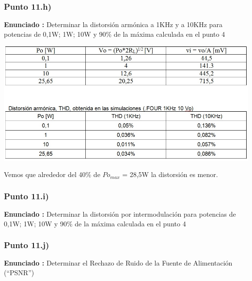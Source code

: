 \documentclass[12pt]{book}
\begin{document}
\subsubsection{Punto 11.h)}
\textbf{Enunciado : } Determinar la distorsión armónica a 1KHz y a 10KHz para potencias de 0,1W; 1W; 10W y 90\% de la máxima calculada en el punto 4\\[1cm]
\begin{center}
\includegraphics[scale=0.5]{figuras/tabla2.jpg}\\
\end{center}
Vemos que alrededor del 40\% de $Po_{max}$ = 28,5W la distorsión es menor.

\subsubsection{Punto 11.i)}
\textbf{Enunciado : } Determinar la distorsión por intermodulación para potencias de 0,1W; 1W; 10W y 90\% de la máxima calculada en el punto 4\\[1cm]

\subsubsection{Punto 11.j)}
\textbf{Enunciado : } Determinar el Rechazo de Ruido de la Fuente de Alimentación (“PSNR”)\\[1cm]
\end{document}

